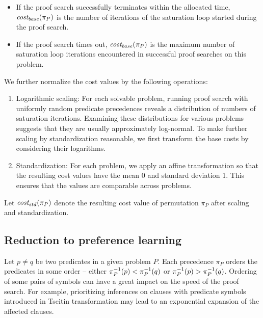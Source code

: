 \begin{itemize}
	\item If the proof search successfully terminates within the allocated time,
	\(\operatorname{\mathit{cost_{base}}}(\pi_P)\) is the number of iterations of the saturation loop
	started during the proof search.
	\item If the proof search times out, \(\operatorname{\mathit{cost_{base}}}(\pi_P)\) is the maximum number
	of saturation loop iterations encountered in successful proof searches on this problem.
\end{itemize}

We further normalize the cost values by the following operations:

\begin{enumerate}
	\item Logarithmic scaling:
	For each solvable problem, running proof search with uniformly random predicate precedences
	reveals a distribution of numbers of saturation iterations.
	Examining these distributions for various problems suggests that they are usually
	approximately log-normal.
	To make further scaling by standardization reasonable,
	we first transform the base costs by considering their logarithms.
	\item Standardization\cite{?}:
	For each problem,
	we apply an affine transformation so that the resulting cost values
	have the mean 0 and standard deviation 1.
	This ensures that the values are comparable across problems.
\end{enumerate}

Let \(\operatorname{\mathit{cost_{std}}}(\pi_P)\) denote the resulting cost value of permutation \(\pi_P\)
after scaling and standardization.

\subsection{Reduction to preference learning}

Let \(p \neq q\) be two predicates in a given \gls{problem} \(P\).
Each precedence \(\pi_P\) orders the predicates in some order --
either \(\pi_P^{-1}(p) < \pi_P^{-1}(q)\) or \(\pi_P^{-1}(p) > \pi_P^{-1}(q)\).
Ordering of some pairs of symbols can have a great impact on the speed of the proof search.
For example, prioritizing inferences on clauses with predicate symbols
introduced in Tseitin transformation
may lead to an exponential expansion of the affected clauses.

